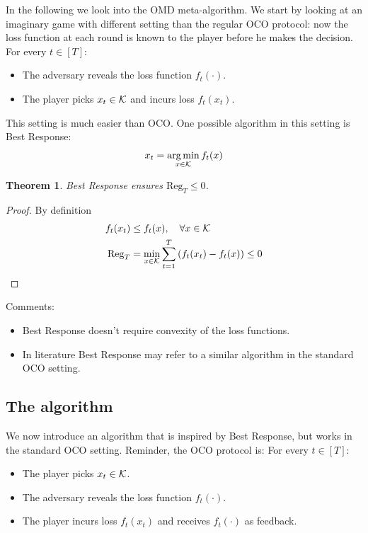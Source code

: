\documentclass[11pt]{article}
\newtheorem{theorem}{Theorem}[section]
\theoremstyle{definition}
\theoremstyle{definition}
\newcommand{\pth}[1]{\left( #1\right)}                 %
\newcommand{\brk}[1]{\left[ #1\right]}                 %
\newcommand{\Kset}{\ensuremath{\K}}
\renewcommand{\regret}{\ensuremath{\mathrm{{Reg}}}}
\begin{document}
In the following we look into the OMD meta-algorithm.
We start by looking at an imaginary game with different setting than the regular OCO protocol: now the loss function at each round is known to the player before he makes the decision.
For every $t \in \brk{T} $:
\begin{itemize}
\item The adversary reveals the loss function $ f_t(\cdot) $.
\item The player picks $ x_t \in \Kset $ and incurs loss $ f_t(x_t) $.
\end{itemize}

This setting is much easier than OCO. One possible algorithm in this setting is Best Response:
\begin{equation*}
x_t = \argmin_{x \in \Kset} f_t(x)
\end{equation*} 

\begin{theorem}
Best Response ensures $ \regret_T \leq 0 $.
\end{theorem}

\begin{proof}
By definition
\begin{equation*}
\begin{aligned}
f_t(x_t) & \leq f_t(x), \quad \forall x \in \Kset
\\
\regret_T & = \min_{x \in \Kset} \sum_{t=1}^{T} \pth{f_t(x_t) - f_t(x)} \leq 0
\end{aligned}
\end{equation*}
\end{proof}

Comments:
\begin{itemize}
\item Best Response doesn't require convexity of the loss functions.
\item In literature Best Response may refer to a similar algorithm in the standard OCO setting.
\end{itemize}



\subsection{The algorithm}

We now introduce an algorithm that is inspired by Best Response, but works in the standard OCO setting. Reminder, the OCO protocol is:
For every $t \in \brk{T} $:
\begin{itemize}
\item The player picks $ x_t \in \Kset $.
\item The adversary reveals the loss function $ f_t(\cdot) $.
\item The player incurs loss $ f_t(x_t) $ and receives $ f_t(\cdot) $ as feedback.
\end{itemize}
\end{document}
